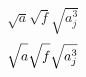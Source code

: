 \documentclass{book}
\begin{document}
$$\sqrt{a}\sqrt{f}\sqrt{a_{j}^{3}}$$
$$\sqrt{a\vphantom{a_{j}^{3}}}
\sqrt{f\vphantom{a_{j}^{3}}}
\sqrt{a_{j}^{3}}$$
\end{document}
